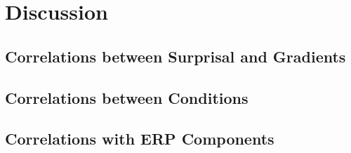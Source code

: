 \documentclass{IEEEtran}
\begin{document}
\section{Discussion}
\subsection{Correlations between Surprisal and Gradients}


\subsection{Correlations between Conditions}


\subsection{Correlations with ERP Components}

\end{document}

